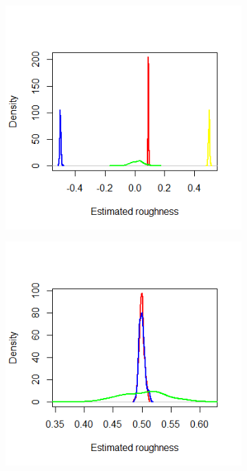 \documentclass{article}
\begin{document}
\begin{figure}[htbp]
    \centering
    
    \begin{subfigure}{0.48\textwidth}
        \includegraphics[width=\linewidth]{ex6_densRV.png}
    \end{subfigure}
    \hfill
    \begin{subfigure}{0.48\textwidth}
        \includegraphics[width=\linewidth]{ex6_densIV.png}
    \end{subfigure}
    

\end{figure}
\end{document}
